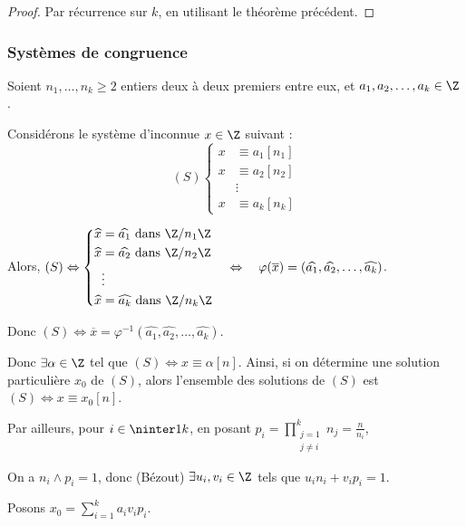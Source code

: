 \begin{proof}
    Par récurrence sur $k$, en utilisant le théorème précédent.
\end{proof}

\subsubsection{Systèmes de congruence }

Soient $n_1, \ldots, n_k \geqslant 2$ entiers deux à deux premiers entre eux, et 
$a_1, a_2, \ldots, a_k \in \Z$.

Considérons le système d'inconnue $x \in \Z$ suivant :
\[
    (S) \left\{ 
        \begin{aligned}
            x & \equiv a_1 [n_1] \\
            x & \equiv a_2 [n_2] \\
            & \vdots \\
            x & \equiv a_k [n_k]
        \end{aligned}
    \right.
\] 

Alors, $(S) \Leftrightarrow \left\{ 
    \begin{aligned}
        \widehat x & = \widehat{a_1} \text{ dans } \Z / n_1 \Z \\
        \widehat x & = \widehat{a_2} \text{ dans } \Z / n_2 \Z \\
        & \vdots \\
        \widehat x & = \widehat{a_k} \text{ dans } \Z / n_k \Z
    \end{aligned} \right. \quad \Leftrightarrow  \quad\varphi(\overline x) = (\widehat{a_1}, \widehat{a_2}, \ldots, \widehat{a_k})$.

Donc $(S) \Leftrightarrow \overline x = \varphi^{-1}(\widehat{a_1}, \widehat{a_2}, \ldots, \widehat{a_k})$.

Donc $\exists \alpha \in \Z$ tel que $(S) \Leftrightarrow x \equiv \alpha [n]$. Ainsi, si on détermine 
une solution particulière $x_0$ de $(S)$, alors l'ensemble des solutions de $(S)$ est 
$(S) \Leftrightarrow x \equiv x_0 [n]$.

Par ailleurs, pour $i \in \ninter 1 k$, en posant $\displaystyle p_i = \prod_{\substack{j = 1 \\ j \neq i}}^k n_j = \frac n {n_i}$,

On a $n_i \wedge p_i = 1$, donc (Bézout) $\exists u_i, v_i \in \Z$ tels que $u_i n_i + v_i p_i = 1$.

Posons $x_0 = \displaystyle \sum_{i = 1}^k a_i v_i p_i$.

